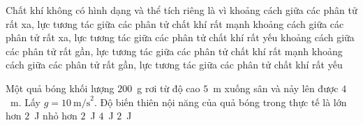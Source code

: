 	\begin{ex}%
		Chất khí không có hình dạng và thể tích riêng là vì
		\choice
		{khoảng cách giữa các phân tử rất xa, lực tương tác giữa các phân tử chất khí rất mạnh}
		{\True khoảng cách giữa các phân tử rất xa, lực tương tác giữa các phân tử chất khí rất yếu}
		{khoảng cách giữa các phân tử rất gần, lực tương tác giữa các phân tử chất khí rất mạnh}
		{khoảng cách giữa các phân tử rất gần, lực tương tác giữa các phân tử chất khí rất yếu}
	\end{ex}

	\begin{ex}%
		Một quả bóng khối lượng $200$~g rơi từ độ cao $5$~m xuống sân và nảy lên được $4$~m. Lấy $g=10~\text{m/s}^2$. Độ biến thiên nội năng của quả bóng trong thực tế là
		\choice
		{lớn hơn $2$~J}
		{\True nhỏ hơn $2$~J}
		{$4$~J}
		{$2$~J}
	\end{ex}

